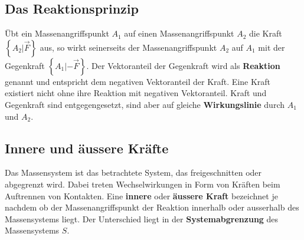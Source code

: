 \subsection{Das Reaktionsprinzip}
Übt ein Massenangriffspunkt $A_1$ auf einen Massenangriffspunkt $A_2$ die Kraft $\left\{A_2 | \overrightarrow{F}\right\}$ aus, so wirkt seinerseits der Massenangriffspunkt $A_2$ auf $A_1$ mit der Gegenkraft $\left\{A_1 | -\overrightarrow{F}\right\}$.  
\newline\newline
Der Vektoranteil der Gegenkraft wird als \textbf{Reaktion} genannt und entspricht dem negativen Vektoranteil der Kraft. Eine Kraft existiert nicht ohne ihre Reaktion mit negativen Vektoranteil. Kraft und Gegenkraft sind entgegengesetzt, sind aber auf gleiche \textbf{Wirkungslinie} durch $A_1$ und $A_2$.
\subsection{Innere und äussere Kräfte}
Das Massensystem ist das betrachtete System, das freigeschnitten oder abgegrenzt wird. Dabei treten Wechselwirkungen in Form von Kräften beim Auftrennen von Kontakten. Eine \textbf{innere} oder \textbf{äussere Kraft} bezeichnet je nachdem ob der Massenangriffspunkt der Reaktion innerhalb oder ausserhalb des Massensystems liegt. Der Unterschied liegt in der \textbf{Systemabgrenzung} des Massensystems $S$. 

